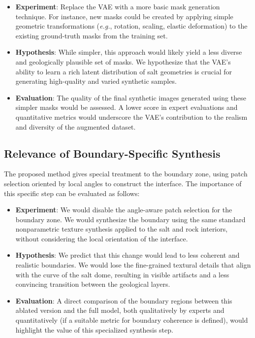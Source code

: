 \documentclass{ieeeaccess}
\begin{document}
\begin{itemize}
    \item \textbf{Experiment}: Replace the VAE with a more basic mask generation technique. For instance, new masks could be created by applying simple geometric transformations (\emph{e.g.}, rotation, scaling, elastic deformation) to the existing ground-truth masks from the training set.
    \item \textbf{Hypothesis}: While simpler, this approach would likely yield a less diverse and geologically plausible set of masks. We hypothesize that the VAE's ability to learn a rich latent distribution of salt geometries is crucial for generating high-quality and varied synthetic samples.
    \item \textbf{Evaluation}: The quality of the final synthetic images generated using these simpler masks would be assessed. A lower score in expert evaluations and quantitative metrics would underscore the VAE's contribution to the realism and diversity of the augmented dataset.
\end{itemize}

\subsection{Relevance of Boundary-Specific Synthesis}

The proposed method gives special treatment to the boundary zone, using patch selection oriented by local angles to construct the interface. The importance of this specific step can be evaluated as follows:

\begin{itemize}
    \item \textbf{Experiment}: We would disable the angle-aware patch selection for the boundary zone. We would synthesize the boundary using the same standard nonparametric texture synthesis applied to the salt and rock interiors, without considering the local orientation of the interface.
    \item \textbf{Hypothesis}: We predict that this change would lead to less coherent and realistic boundaries. We would lose the fine-grained textural details that align with the curve of the salt dome, resulting in visible artifacts and a less convincing transition between the geological layers.
    \item \textbf{Evaluation}: A direct comparison of the boundary regions between this ablated version and the full model, both qualitatively by experts and quantitatively (if a suitable metric for boundary coherence is defined), would highlight the value of this specialized synthesis step.
\end{itemize}
\end{document}
